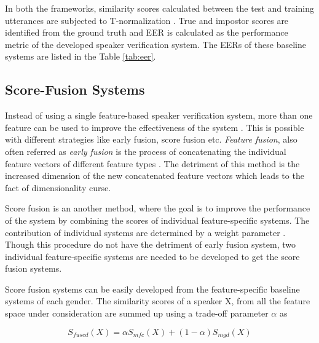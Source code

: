 \documentclass{article}
\begin{document}
In both the frameworks, similarity scores calculated between the test and training utterances are subjected to T-normalization \cite{tnorm}. True and impostor scores are identified from the ground truth and EER is calculated as the performance metric of the developed speaker verification system. The EERs of these baseline systems are listed in the Table \ref{tab:eer}.

\subsection{Score-Fusion Systems}
\label{subsec:scoreFusion}
	Instead of using a single feature-based speaker verification system, more than one feature can be used to improve the effectiveness of the system \cite{scoreFusion, scoreFusion1}. This is possible with different strategies like early fusion, score fusion etc. {\it Feature fusion}, also often referred as {\it early fusion} is the process of concatenating the individual feature vectors of different feature types \cite{padmanInterspeech2010}. The detriment of this method is the increased dimension of the new concatenated feature vectors which leads to the fact of dimensionality curse. 

\vspace{0.25 cm}	
	Score fusion is an another method, where the goal is to improve the performance of the system by combining the scores of individual feature-specific systems. The contribution of individual systems are determined by a weight parameter \cite{scoreFusion}. Though this procedure do not have the detriment of early fusion system, two individual feature-specific systems are needed to be developed to get the score fusion systems.
	 
\vspace{0.25 cm}	
	Score fusion systems can be easily developed from the feature-specific baseline systems of each gender. The similarity scores of a speaker X, from all the feature space under consideration are summed up using a trade-off parameter $\alpha$ as  %
	
	\begin{equation}
	 S_{fused}\left( X \right) = \alpha S_{mfc}\left( X \right) + (1-\alpha)S_{mgd}\left( X \right)
	\label{eq:scoreFuse}
	\end{equation}
	
\end{document}
